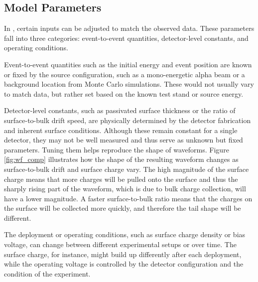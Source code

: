 \subsection{Model Parameters}

In {\ehd}, certain inputs can be adjusted to match the observed data. These parameters fall into three categories: event-to-event quantities, detector-level constants, and operating conditions.

Event-to-event quantities such as the initial energy and event position are known or fixed by the source configuration, such as a mono-energetic alpha beam or a background location from Monte Carlo simulations. These would not usually vary to match data, but rather set based on the known test stand or source energy.

Detector-level constants, such as passivated surface thickness or the ratio of surface-to-bulk drift speed, are physically determined by the detector fabrication and inherent surface conditions. Although these remain constant for a single detector, they may not be well measured and thus serve as unknown but fixed parameters. Tuning them helps reproduce the shape of waveforms. Figure \ref{fig:wf_comp} illustrates how the shape of the resulting waveform changes as surface-to-bulk drift and surface charge vary. The high magnitude of the surface charge means that more charges will be pulled onto the surface and thus the sharply rising part of the waveform, which is due to bulk charge collection, will have a lower magnitude. A faster surface-to-bulk ratio means that the charges on the surface will be collected more quickly, and therefore the tail shape will be different.

The deployment or operating conditions, such as surface charge density or bias voltage, can change between different experimental setups or over time. The surface charge, for instance, might build up differently after each deployment, while the operating voltage is controlled by the detector configuration and the condition of the experiment.

